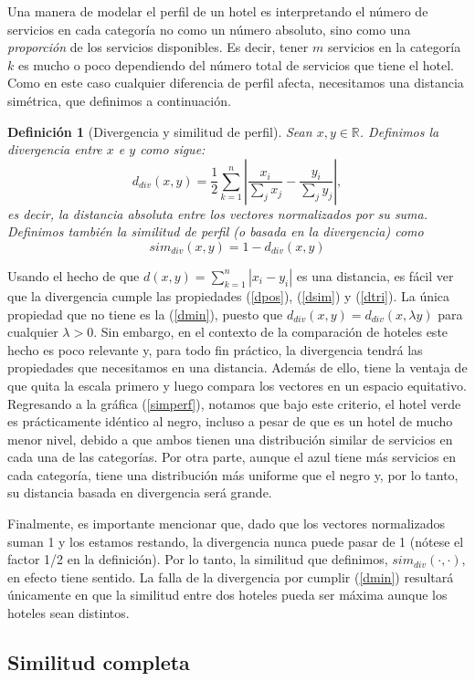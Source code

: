 \documentclass[12pt]{report}
\newcommand{\R}{\mathbb{R}}
\newtheorem{defn}{Definici\'on}[chapter]
\begin{document}
Una manera de modelar el perfil de un hotel es interpretando el número de servicios en cada categoría no como un número absoluto, sino como una \emph{proporción} de los servicios disponibles. Es decir, tener $m$ servicios en la categoría $k$ es mucho o poco dependiendo del número total de servicios que tiene el hotel. Como en este caso cualquier diferencia de perfil afecta, necesitamos una distancia simétrica, que definimos a continuación.
\begin{defn}[Divergencia y similitud de perfil]
Sean $x, y \in \R$. Definimos la divergencia entre $x$ e $y$ como sigue:
\[
d_{div}(x, y) = \frac{1}{2}\sum_{k=1}^n \left|\frac{x_i}{\sum_j x_j} - \frac{y_i}{\sum_j y_j}\right|,
\]
es decir, la distancia absoluta entre los vectores normalizados por su suma. Definimos también la similitud de perfil (o basada en la divergencia) como
\[
sim_{div}(x,y) = 1 - d_{div}(x,y)
\]
\end{defn}
Usando el hecho de que $d(x,y) = \sum_{k=1}^n | x_i - y_i |$ es una distancia, es fácil ver que la divergencia cumple las propiedades (\ref{dpos}), (\ref{dsim}) y (\ref{dtri}). La única propiedad que no tiene es la (\ref{dmin}), puesto que $d_{div}(x,y) = d_{div}(x,\lambda y)$ para cualquier $\lambda > 0$. Sin embargo, en el contexto de la comparación de hoteles este hecho es poco relevante y, para todo fin práctico, la divergencia tendrá las propiedades que necesitamos en una distancia. Además de ello, tiene la ventaja de que quita la escala primero y luego compara los vectores en un espacio equitativo. Regresando a la gráfica (\ref{simperf}), notamos que bajo este criterio, el hotel verde es prácticamente idéntico al negro, incluso a pesar de que es un hotel de mucho menor nivel, debido a que ambos tienen una distribución similar de servicios en cada una de las categorías. Por otra parte, aunque el azul tiene más servicios en cada categoría, tiene una distribución más uniforme que el negro y, por lo tanto, su distancia basada en divergencia será grande.

Finalmente, es importante mencionar que, dado que los vectores normalizados suman 1 y los estamos restando, la divergencia nunca puede pasar de 1 (nótese el factor 1/2 en la definición). Por lo tanto, la similitud que definimos, $sim_{div}(\cdot,\cdot)$, en efecto tiene sentido. La falla de la divergencia por cumplir (\ref{dmin}) resultará únicamente en que la similitud entre dos hoteles pueda ser máxima aunque los hoteles sean distintos.

\subsection*{Similitud completa}
\end{document}
